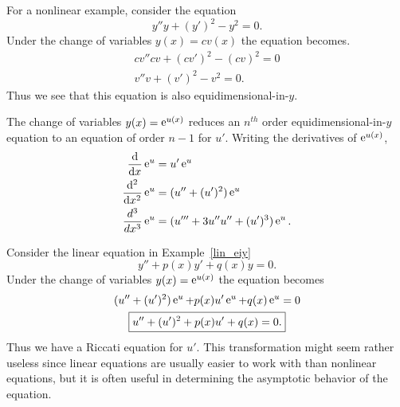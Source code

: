 \begin{Example} \label{nonlin_eiy}
  For a nonlinear example, consider the equation
  \[ y'' y + (y')^2 - y^2 = 0.\]
  Under the change of variables $y(x) = c v(x)$ the equation becomes.
  \begin{gather*}
    c v'' c v + (c v')^2 - (c v)^2 = 0 \\
    v'' v + (v')^2 - v^2 = 0.
  \end{gather*}
  Thus we see that this equation is also equidimensional-in-$y$.
\end{Example}



The change of variables $y(x) = \mathop{\mathrm{e}}\nolimits^{u(x)}$ reduces an $n^{t h}$ order
equidimensional-in-$y$ equation to an equation of order $n-1$ for $u'$.
Writing the derivatives of $\mathop{\mathrm{e}}\nolimits^{u(x)}$,
\begin{align*}
  \frac{\mathrm{d}}{\mathrm{d} x} \mathop{\mathrm{e}}\nolimits^u &= u' \mathop{\mathrm{e}}\nolimits^u \\
  \frac{\mathrm{d}^2}{\mathrm{d} x^2} \mathop{\mathrm{e}}\nolimits^u &= (u'' + (u')^2)\mathop{\mathrm{e}}\nolimits^u \\
  \frac{d^3}{d x^3}\mathop{\mathrm{e}}\nolimits^u &= (u''' + 3u'' u'' + (u')^3)\mathop{\mathrm{e}}\nolimits^u.
\end{align*}


\begin{Example}
  Consider the linear equation in Example~\ref{lin_eiy} 
  \[ y'' + p(x) y' + q(x) y = 0.\]
  Under the change of variables $y(x) = \mathop{\mathrm{e}}\nolimits^{u(x)}$ the equation becomes
  \begin{gather*}
    (u'' + (u')^2)\mathop{\mathrm{e}}\nolimits^u + p(x) u' \mathop{\mathrm{e}}\nolimits^u + q(x) \mathop{\mathrm{e}}\nolimits^u = 0 \\
    \boxed{ u'' + (u')^2 + p(x) u' + q(x) = 0. }
  \end{gather*}
  Thus we have a Riccati  equation for $u'$.  
  This transformation might seem rather useless since linear equations are usually
  easier to work with than nonlinear equations, but it is often useful in determining
  the asymptotic behavior of the equation.
\end{Example}





